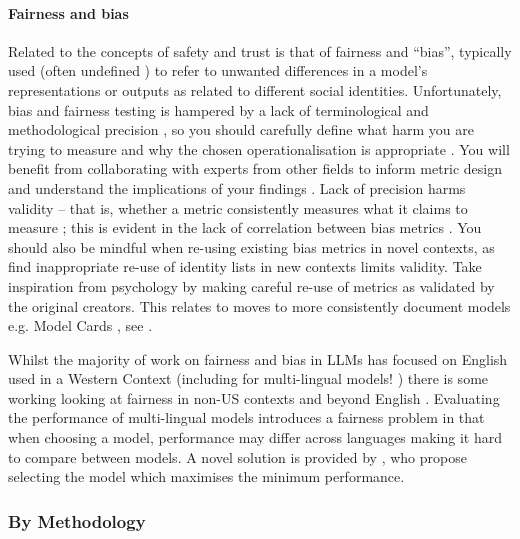 \paragraph{Fairness and bias}
Related to the concepts of safety and trust is that of fairness and ``bias'', typically used (often undefined \citep{blodgett_language_2020}) to refer to unwanted differences in a model's representations or outputs as related to different social identities. Unfortunately, bias and fairness testing is hampered by a lack of terminological and methodological precision \citep{goldfarb-tarrant_this_2023,blodgett_language_2020,blodgett_stereotyping_2021,cabello_independence_2023}, so you should carefully define what harm you are trying to measure and why the chosen operationalisation is appropriate \citep{goldfarb-tarrant_this_2023}. You will benefit from collaborating with experts from other fields to inform metric design and understand the implications of your findings \citep{goldfarb-tarrant_this_2023, blodgett_language_2020}. Lack of precision harms validity --  that is, whether a metric consistently measures what it claims to measure \cite{goldfarb-tarrant_this_2023,delobelle_measuring_2022,blodgett_stereotyping_2021}; this is evident in the lack of correlation between bias metrics \citep{delobelle_measuring_2022,dev_measures_2022}. You should also be mindful when re-using existing bias metrics in novel contexts, as \citet{goldfarb-tarrant_this_2023} find inappropriate re-use of identity lists in new contexts limits validity. Take inspiration from psychology by making careful re-use of metrics as validated by the original creators. This relates to moves to more consistently document models e.g. Model Cards \citep{mitchell_model_2019}, see . 

Whilst the majority of work on fairness and bias in LLMs has focused on English used in a Western Context (including for multi-lingual models! \citep{goldfarb-tarrant_this_2023}) there is some working looking at fairness in non-US contexts and beyond English \citep{bhatt_re-contextualizing_2022, ramesh_fairness_2023}. Evaluating the performance of multi-lingual models introduces a fairness problem in that when choosing a model, performance may differ across languages making it hard to compare between models. A novel solution is provided by \citet{choudhury_how_2021}, who propose selecting the model which maximises the minimum performance.

\subsubsection{By Methodology}
